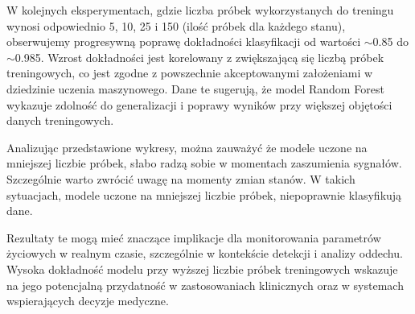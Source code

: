\documentclass{article}
\begin{document}
W kolejnych eksperymentach, gdzie liczba próbek wykorzystanych do treningu wynosi odpowiednio 5, 10, 25 i 150 (ilość próbek dla każdego stanu), obserwujemy progresywną poprawę dokładności klasyfikacji od wartości $\sim$0.85 do $\sim$0.985. Wzrost dokładności jest korelowany z zwiększającą się liczbą próbek treningowych, co jest zgodne z powszechnie akceptowanymi założeniami w dziedzinie uczenia maszynowego. Dane te sugerują, że model Random Forest wykazuje zdolność do generalizacji i poprawy wyników przy większej objętości danych treningowych.

Analizując przedstawione wykresy, można zauważyć że modele uczone na mniejszej liczbie próbek, słabo radzą sobie w momentach zaszumienia sygnałów. Szczególnie warto zwrócić uwagę na momenty zmian stanów. W takich sytuacjach, modele uczone na mniejszej liczbie próbek, niepoprawnie klasyfikują dane.

Rezultaty te mogą mieć znaczące implikacje dla monitorowania parametrów życiowych w realnym czasie, szczególnie w kontekście detekcji i analizy oddechu. Wysoka dokładność modelu przy wyższej liczbie próbek treningowych wskazuje na jego potencjalną przydatność w zastosowaniach klinicznych oraz w systemach wspierających decyzje medyczne.
\end{document}
